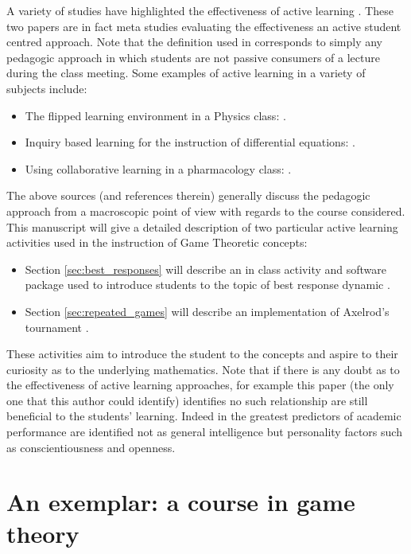 \documentclass{article}
\begin{document}
A variety of studies have highlighted the effectiveness of active learning
\cite{Freeman2014, Hake1998, Prince2004}. These two papers are in fact meta studies
evaluating the effectiveness an active student centred approach. Note that the
definition used in \cite{Freeman2014} corresponds to simply any pedagogic
approach in which students are not passive consumers of a lecture during the
class meeting. Some examples of active learning in a variety of subjects include:

\begin{itemize}
    \item The flipped learning environment in a Physics class: \cite{Bates}.
    \item Inquiry based learning for the instruction of differential equations:
        \cite{Kwon2005}.
    \item Using collaborative learning in a pharmacology class:
        \cite{Depaz2008}.
\end{itemize}

The above sources (and references therein) generally discuss the pedagogic
approach from a macroscopic point of view with regards to the course considered.
This manuscript will give a detailed description of two particular active
learning activities used in the instruction of Game Theoretic concepts:

\begin{itemize}
    \item Section \ref{sec:best_responses} will describe an in class activity
        and software package used to introduce students to the topic of best
        response dynamic \cite{Maschler2013}.
    \item Section \ref{sec:repeated_games} will describe an implementation of
        Axelrod's tournament \cite{Axelrod1980a, Axelrod1980b}.
\end{itemize}

These activities aim to introduce the student to the concepts and aspire to
their curiosity as to the underlying mathematics. Note that if there is any
doubt as to the effectiveness of active learning approaches, for example this paper
(the only one that this author could identify) \cite{Andrews2011} identifies no
such relationship are still beneficial to the students' learning.
Indeed in \cite{Poropat2014}  the greatest predictors of
academic performance are identified not as general intelligence \cite{Wright1905} but
personality factors such as conscientiousness and openness.

\section{An exemplar: a course in game theory}\label{sec:game_theory}
\end{document}
